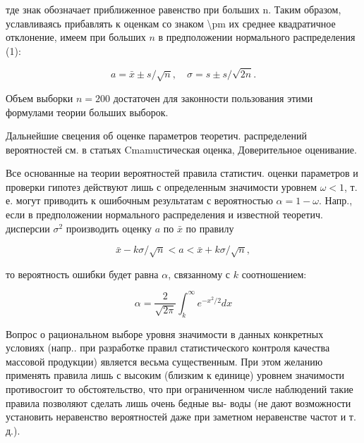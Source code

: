 \documentclass[10pt]{article}
\begin{document}
тде знак обозначает приближенное равенство при больших n. Таким образом, уславливаясь прибавлять к оценкам со знаком \textbackslash pm их среднее квадратичное отклонение, имеем при больших $n$ в предположении нормального распределения (1):



\[

a=\bar{x} \pm s / \sqrt{n}, \quad \sigma=s \pm s / \sqrt{2 n} .

\]



Объем выборки $n=200$ достаточен для законности пользования этими формулами теории больших выборок.



Дальнейшие свецения об оценке параметров теоретич. распределений вероятностей см. в статьях Cmamuстическая оценка, Доверительное оценивание.



Все основанные на теории вероятностей правила статистич. оценки параметров и проверки гипотез действуют лишь с определенным значимости уровнем $\omega<1$, т. е. могут приводить к ошибочным результатам с вероятностью $\alpha=1-\omega$. Напр., если в предположении нормального распределения и известной теоретич. дисперсии $\sigma^{2}$ производить оценку $a$ по $\bar{x}$ по правилу



\[

\bar{x}-k \sigma / \sqrt{n}<a<\bar{x}+k \sigma / \sqrt{n},

\]



то вероятность ошибки будет равна $\alpha$, связанному с $k$ соотношением:



\[

\alpha=\frac{2}{\sqrt{2 \pi}} \int_{k}^{\infty} e^{-x^{2} / 2} d x

\]



Вопрос о рациональном выборе уровня значимости в данных конкретных условиях (напр.. при разработке правил статистического контроля качества массовой продукции) является весьма существенным. При этом желанию применять правила лишь с высоким (близким к единице) уровнем значимости противосгоит то обстоятельство, что при ограниченном числе наблюдений такие правила позволяют сделать лишь очень бедные вы- воды (не дают возможности установить неравенство вероятностей даже при заметном неравенстве частот и т. д.).
\end{document}
